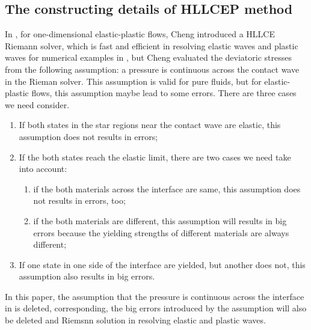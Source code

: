\documentclass{article}
\numberwithin{equation}{section}
\numberwithin{table}{section}
\begin{document}
\subsection{The constructing details of HLLCEP method}

In \cite{hllce}, for one-dimensional elastic-plastic flows, Cheng introduced a HLLCE Riemann solver, which is fast and efficient in resolving elastic waves and plastic waves for numerical examples in \cite{hllce}, but Cheng evaluated the deviatoric stresses from the following assumption: a pressure is continuous across the contact wave in the Rieman solver. This assumption is valid for pure fluids, but for elastic-plastic flows, this assumption maybe lead to some errors. There are three cases we need consider. 
\begin{enumerate}
  \item If both states in the star regions near the contact wave are elastic, this assumption does not results in errors;
  \item If the both states reach the elastic limit, there are two cases we need take into account:
  \begin{enumerate}
    \item if the both materials across the interface are same, this assumption does not results in errors, too; 
    \item if the both materials are different, this assumption will results in big errors because the yielding strengths of different materials are always different; 
  \end{enumerate}
  \item If one state in one side of the interface are yielded, but another does not,  this assumption also results in big errors. 
\end{enumerate}

In this paper, the assumption that the pressure is continuous across the interface in \cite{hllce} is deleted, corresponding, the big errors introduced by the assumption will also be deleted and Riemsnn solution in resolving elastic and plastic waves. 
\end{document}

